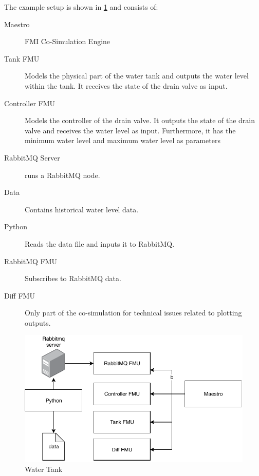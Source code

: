 The example setup is shown in \cref{fig:rabbitmq-example} and consists of:
\begin{description}
  \item[Maestro] FMI Co-Simulation Engine
    \item[Tank FMU] Models the physical part of the water tank and outputs the
    water level within the tank. It receives the state of the drain valve as input.
    \item[Controller FMU] Models the controller of the drain valve. It outputs
    the state of the drain valve and receives the water level as input.
    Furthermore, it has the minimum water level and maximum water level as
    parameters
    \item[RabbitMQ Server] runs a RabbitMQ node.
  \item[Data] Contains historical water level data.
  \item[Python] Reads the data file and inputs it to RabbitMQ.
  \item[RabbitMQ FMU] Subscribes to RabbitMQ data.
    \item[Diff FMU] Only part of the co-simulation for technical issues related to plotting outputs.
\end{description}
\begin{figure}[!htb]
  \centering
  \includegraphics[]{figures/rabbitmq-example.pdf}
  \caption{Water Tank}
  \label{fig:rabbitmq-example}
\end{figure}

